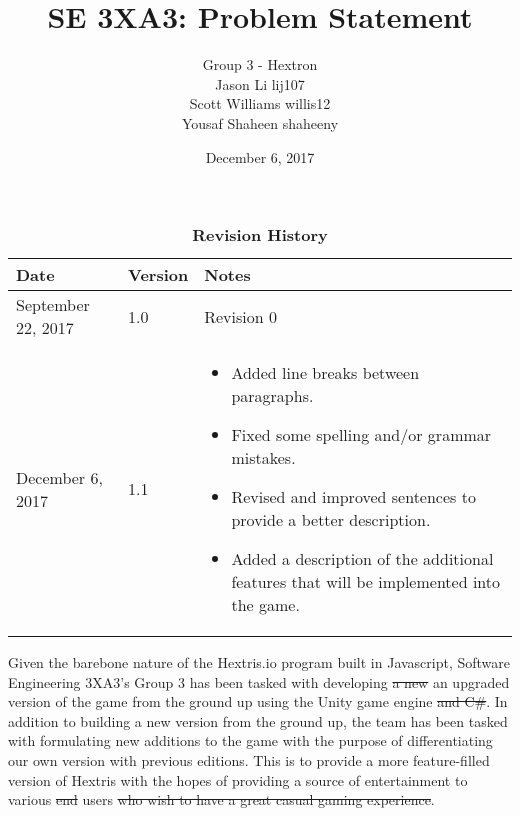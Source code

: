 \documentclass[12pt]{article}
\title{SE 3XA3: Problem Statement}
\date{December 6, 2017}
\author{Group 3 - Hextron
		\\ Jason Li lij107
		\\ Scott Williams willis12
		\\ Yousaf Shaheen shaheeny
}
\begin{document}
 
	

\maketitle
\newpage

\begin{table}[]
\caption{\bf Revision History}
\begin{tabularx}{\textwidth}{p{3cm}p{2cm}X}
\toprule {\bf Date} & {\bf Version} & {\bf Notes}\\
\midrule
September 22, 2017 & 1.0 & Revision 0 \\ \hline
December 6, 2017 & 1.1 & \begin{itemize}[leftmargin=0cm,itemindent=.5cm,labelwidth=\itemindent,labelsep=0cm,align=left,itemsep = 0mm,nosep]


  \item Added line breaks between paragraphs.
  \item Fixed some spelling and/or grammar mistakes.
  \item Revised and improved sentences to provide a better description.
  \item Added a description of the additional features that will be implemented into the game.
  
\end{itemize} \\
\bottomrule
\end{tabularx}
\end{table}
\vspace*{\fill}

\newpage

Given the barebone nature of the Hextris.io program built in Javascript, Software Engineering 3XA3's Group 3 has been tasked with developing \sout{a new} {\color{blue}an upgraded} version of the game from the ground up using the Unity game engine \sout{and C\#}. In addition to building a new version from the ground up, the team has been tasked with formulating new additions to the game with the purpose of differentiating our own version with previous editions. This is to provide a more feature-filled version of Hextris with the hopes of providing a source of entertainment to various \sout{end} users \sout{who wish to have a great casual gaming experience}. \\
\end{document}
